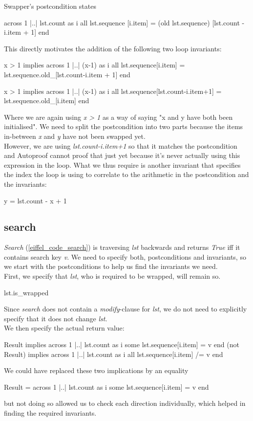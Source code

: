 Swapper's postcondition states
\begin{eSimple}
across 1 |..| lst.count as i all lst.sequence [i.item] = (old lst.sequence) [lst.count - i.item + 1] end
\end{eSimple}
This directly motivates the addition of the following two loop invariants:
\begin{eSimple}
x > 1 implies across 1 |..| (x-1) as i all lst.sequence[i.item] = lst.sequence.old_[lst.count-i.item + 1] end

x > 1 implies across 1 |..| (x-1) as i all lst.sequence[lst.count-i.item+1] = lst.sequence.old_[i.item] end
\end{eSimple}
Where we are again using \emph{x > 1} as a way of saying "x and y have both been initialised". We need to split the postcondition into two parts because the items in-between \emph{x} and \emph{y} have not been swapped yet.\\

However, we are using \emph{lst.count-i.item+1} so that it matches the postcondition and Autoproof cannot proof that just yet because it's never actually using this expression in the loop. What we thus require is another invariant that specifies the index the loop is using to correlate to the arithmetic in the postcondition and the invariants:
\begin{eSimple}
y = lst.count - x + 1
\end{eSimple}

\subsection{search}
\emph{Search} (\ref{eiffel_code_search}) is traversing \emph{lst} backwards and returns \emph{True} iff it contains search key \emph{v}. We need to specify both, postconditions and invariants, so we start with the postconditions to help us find the invariants we need.\\

First, we specify that \emph{lst}, who is required to be wrapped, will remain so.
\begin{eSimple}
lst.is_wrapped
\end{eSimple}
Since \emph{search} does not contain a \emph{modify}-clause for \emph{lst}, we do not need to explicitly specify that it does not change \emph{lst}.\\

We then specify the actual return value:
\begin{eSimple}
Result implies across 1 |..| lst.count as i some lst.sequence[i.item] = v end
(not Result) implies across 1 |..| lst.count as i all lst.sequence[i.item] /= v end
\end{eSimple}
We could have replaced these two implications by an equality
\begin{eSimple}
Result = across 1 |..| lst.count as i some lst.sequence[i.item] = v end
\end{eSimple}
but not doing so allowed us to check each direction individually, which helped in finding the required invariants.\\

